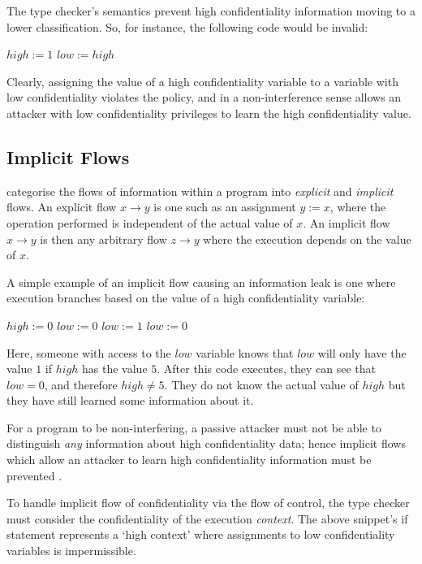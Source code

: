 The type checker's semantics prevent high confidentiality information moving to a lower classification. So, for instance, the following code would be invalid:

\begin{algorithmic}
\State $ high := 1 $
\State $ low := high $
\end{algorithmic}

Clearly, assigning the value of a high confidentiality variable to a variable with low confidentiality violates the policy, and in a non-interference sense allows an attacker with low confidentiality privileges to learn the high confidentiality value.

\subsection{Implicit Flows}

\citeauthor{denning1977certification} \cite{denning1977certification} categorise the flows of information within a program into \textit{explicit} and \textit{implicit} flows. An explicit flow $ x \rightarrow y $ is one such as an assignment $ y := x $, where the operation performed is independent of the actual value of $ x $. An implicit flow $ x \rightarrow y $ is then any arbitrary flow $ z \rightarrow y $ where the execution depends on the value of $ x $. 

A simple example of an implicit flow causing an information leak is one where execution branches based on the value of a high confidentiality variable:

\begin{algorithmic}
	\State $ high := 0 $
	\State $ low := 0 $
		\State $ low := 1 $
	\Else
		\State $ low := 0 $
	\EndIf
\end{algorithmic}

Here, someone with access to the $ low $ variable knows that $ low $ will only have the value $ 1 $ if $ high $ has the value $ 5 $. After this code executes, they can see that $ low = 0 $, and therefore $ high \ne 5 $. They do not know the actual value of $ high $ but they have still learned some information about it.

For a program to be non-interfering, a passive attacker must not be able to distinguish \textit{any} information about high confidentiality data; hence implicit flows which allow an attacker to learn high confidentiality information must be prevented \cite{sabelfeld2003if}.


To handle implicit flow of confidentiality via the flow of control, the type checker must consider the confidentiality of the execution \textit{context}. The above snippet's if statement represents a `high context' where assignments to low confidentiality variables is impermissible.

